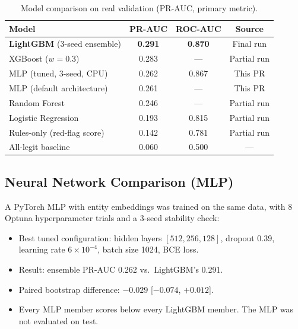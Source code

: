 \documentclass[12pt,a4paper]{article}
\begin{document}
\begin{table}[H]
\centering
\caption{Model comparison on real validation (PR-AUC, primary metric).}
\label{tab:model_zoo}
\begin{tabular}{@{}lccc@{}}
\toprule
\textbf{Model} & \textbf{PR-AUC} & \textbf{ROC-AUC} & \textbf{Source} \\
\midrule
\textbf{LightGBM} (3-seed ensemble) & \textbf{0.291} & \textbf{0.870} & Final run \\
XGBoost ($w = 0.3$)                  & 0.283          & ---            & Partial run \\
MLP (tuned, 3-seed, CPU)             & 0.262          & 0.867          & This PR \\
MLP (default architecture)           & 0.261          & ---            & This PR \\
Random Forest                        & 0.246          & ---            & Partial run \\
Logistic Regression                  & 0.193          & 0.815          & Partial run \\
Rules-only (red-flag score)          & 0.142          & 0.781          & Partial run \\
All-legit baseline                   & 0.060          & 0.500          & --- \\
\bottomrule
\end{tabular}
\end{table}

\subsection{Neural Network Comparison (MLP)}

A PyTorch MLP with entity embeddings was trained on the same data, with 8 Optuna hyperparameter trials and a 3-seed stability check:

\begin{itemize}
    \item Best tuned configuration: hidden layers $[512, 256, 128]$, dropout 0.39, learning rate $6 \times 10^{-4}$, batch size 1024, BCE loss.
    \item Result: ensemble PR-AUC 0.262 vs.\ LightGBM's 0.291.
    \item Paired bootstrap difference: $-0.029$ [$-0.074$, $+0.012$].
    \item Every MLP member scores below every LightGBM member.  The MLP was not evaluated on test.
\end{itemize}
\end{document}
